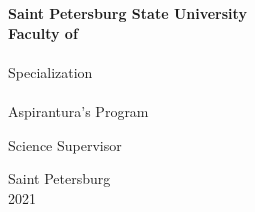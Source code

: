 \newtoks\Specialization %
\newtoks\SpecializationName %
\newtoks\Name %
\newtoks\Supervisor %
\newtoks\Faculty %
\newtoks\Title %
\newtoks\Program %
\newtoks\ReportName %




\large
\begin{titlepage}
\begin{center}
\textbf{Saint Petersburg State University}\\
\textbf{Faculty of \the\Faculty}\\
\vskip 45pt
{\Large \the\Name}
\vskip 20pt
{\Large \the\ReportName}
\vskip 50pt
{\LARGE \textbf{\the\Title}}\\
\vskip 25pt
Specialization \the\Specialization\\
\the\SpecializationName\\
Aspirantura's Program \the\Program 

\vskip 50pt
\begin{singlespacing}
\begin{flushleft}
\hskip 280pt Science Supervisor
\end{flushleft}
\begin{flushleft}
\hskip 280pt \the\Supervisor
\end{flushleft}
\end{singlespacing}
\vfill
Saint Petersburg\\
2021
\end{center}
\end{titlepage}
\clearpage
